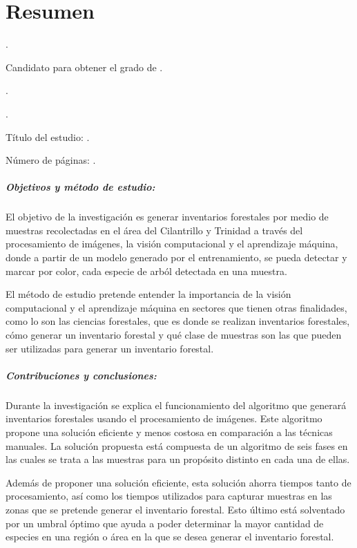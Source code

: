 
\chapter{Resumen}

{\setlength{\leftskip}{10mm}
\setlength{\parindent}{-10mm}

\autor.

Candidato para obtener el grado de \grado\orientacion.

\uanl.

\fime.

Título del estudio: \textsc{\titulo}.

\noindent Número de páginas: \pageref*{lastpage}.}

\paragraph{Objetivos y método de estudio:}
El objetivo de la investigación es generar inventarios forestales por medio de muestras recolectadas en el área del Cilantrillo y Trinidad a través del procesamiento de imágenes, la visión computacional y el aprendizaje máquina, donde a partir de un modelo generado por el entrenamiento, se pueda detectar y marcar por color, cada especie de arból detectada en una muestra.

El método de estudio pretende entender la importancia de la visión computacional y el aprendizaje máquina en sectores que tienen otras finalidades, como lo son las ciencias forestales, que es donde se realizan inventarios forestales, cómo generar un inventario forestal y  qué clase de muestras son las que pueden ser utilizadas para generar un inventario forestal.
\paragraph{Contribuciones y conclusiones:}
Durante la investigación se explica el funcionamiento del algoritmo que generará inventarios forestales usando el procesamiento de imágenes. Este algoritmo propone una solución eficiente y menos costosa en comparación a las técnicas manuales. La solución propuesta está compuesta de un algoritmo de seis fases en las cuales se trata a las muestras para un propósito distinto en cada una de ellas. 

Además de proponer una solución eficiente, esta solución ahorra tiempos tanto de procesamiento, así como los tiempos utilizados para capturar muestras en las zonas que se pretende generar el inventario forestal. Esto último está solventado por un umbral óptimo que ayuda a poder determinar la mayor cantidad de especies en una región o área en la que se desea generar el inventario forestal.

